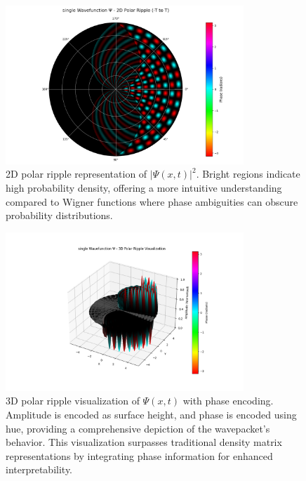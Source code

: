 \documentclass[12pt]{article}
\begin{document}
\begin{figure}[H]
    \centering
    \includegraphics[width=0.8\textwidth]{images/single_wavefunction_2d_polar_probability_density_with_phase.png}
    \caption{2D polar ripple representation of \(|\Psi(x,t)|^2\). Bright regions indicate high probability density, offering a more intuitive understanding compared to Wigner functions where phase ambiguities can obscure probability distributions.}
    \label{fig:single_2d_polar_density}
\end{figure}

\begin{figure}[H]
    \centering
    \includegraphics[width=0.8\textwidth]{images/single_wavefunction_3d_polar_with_phase.png}
    \caption{3D polar ripple visualization of \(\Psi(x,t)\) with phase encoding. Amplitude is encoded as surface height, and phase is encoded using hue, providing a comprehensive depiction of the wavepacket's behavior. This visualization surpasses traditional density matrix representations by integrating phase information for enhanced interpretability.}
    \label{fig:single_3d_polar}
\end{figure}
\end{document}
